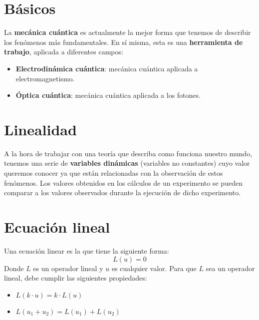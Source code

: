 \documentclass{article}
\begin{document}
\section*{Básicos}
La \textbf{mecánica cuántica} es actualmente la mejor forma que tenemos de describir los fenómenos más fundamentales. En sí misma, esta es una \textbf{herramienta de trabajo}, aplicada a diferentes campos:
\begin{itemize}
    \item \textbf{Electrodinámica cuántica}: mecánica cuántica aplicada a electromagnetismo.
    \item \textbf{Óptica cuántica}: mecánica cuántica aplicada a los fotones.
\end{itemize}
\pagebreak
\section*{Linealidad}
A la hora de trabajar con una teoría que describa como funciona nuestro mundo, tenemos una serie de \textbf{variables dinámicas}  (variables no constantes) cuyo valor queremos conocer ya que están relacionadas con la observación de estos fenómenos. Los valores obtenidos en los cálculos de un experimento se pueden comparar a los valores observados durante la ejecución de dicho experimento.\\

\noindent{}
\pagebreak
\section*{Ecuación lineal}
Una ecuación linear es la que tiene la siguiente forma:
\[
    L(u)=0
\]
Donde $L$ es un operador lineal y $u$ es cualquier valor. Para que $L$ sea un operador lineal, debe cumplir las siguientes propiedades:
\begin{itemize}
    \item $L(k \cdot u)=k\cdot L(u)$
    \item $L(u_1+u_2)=L(u_1)+L(u_2)$
\end{itemize}
\end{document}
